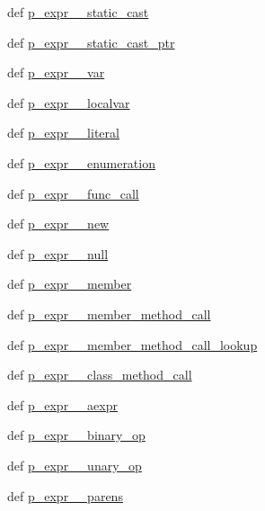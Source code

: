 \begin{DoxyCompactItemize}
\item 
def \hyperlink{classslicc_1_1parser_1_1SLICC_ae253508b9c4220db9770ebb3e7b3067c}{p\_\-expr\_\-\_\-static\_\-cast}
\item 
def \hyperlink{classslicc_1_1parser_1_1SLICC_a82e8e91f1fd31d30fbf563ddd8bca5f9}{p\_\-expr\_\-\_\-static\_\-cast\_\-ptr}
\item 
def \hyperlink{classslicc_1_1parser_1_1SLICC_a9161ad18c5b00a1568d3434079fc118c}{p\_\-expr\_\-\_\-var}
\item 
def \hyperlink{classslicc_1_1parser_1_1SLICC_a62d10d37bd83d7333afb87c080046378}{p\_\-expr\_\-\_\-localvar}
\item 
def \hyperlink{classslicc_1_1parser_1_1SLICC_a60b6aef0cc6effa1fe92344871861c82}{p\_\-expr\_\-\_\-literal}
\item 
def \hyperlink{classslicc_1_1parser_1_1SLICC_ac69362630073a12df80172dbc69a3130}{p\_\-expr\_\-\_\-enumeration}
\item 
def \hyperlink{classslicc_1_1parser_1_1SLICC_acea928fb7b3faee78d787636d4acfadf}{p\_\-expr\_\-\_\-func\_\-call}
\item 
def \hyperlink{classslicc_1_1parser_1_1SLICC_a1b0308a72b6175e110a9ab3211b3f5f7}{p\_\-expr\_\-\_\-new}
\item 
def \hyperlink{classslicc_1_1parser_1_1SLICC_a530b5d501e3749694fc8ff43b0cccfe6}{p\_\-expr\_\-\_\-null}
\item 
def \hyperlink{classslicc_1_1parser_1_1SLICC_a368de9191588eda3ef23d5c70a925f2e}{p\_\-expr\_\-\_\-member}
\item 
def \hyperlink{classslicc_1_1parser_1_1SLICC_ab69f80240020a575538a4020423f6fb9}{p\_\-expr\_\-\_\-member\_\-method\_\-call}
\item 
def \hyperlink{classslicc_1_1parser_1_1SLICC_a9f4d3bdee654812bf1f5ad304c6770eb}{p\_\-expr\_\-\_\-member\_\-method\_\-call\_\-lookup}
\item 
def \hyperlink{classslicc_1_1parser_1_1SLICC_ae00e73eee817bee36138e741067e1f02}{p\_\-expr\_\-\_\-class\_\-method\_\-call}
\item 
def \hyperlink{classslicc_1_1parser_1_1SLICC_a19c8ee869a956f0f8ff0cc76c60bea40}{p\_\-expr\_\-\_\-aexpr}
\item 
def \hyperlink{classslicc_1_1parser_1_1SLICC_ad3ab7bf47fe2daa12fb9103972144b2b}{p\_\-expr\_\-\_\-binary\_\-op}
\item 
def \hyperlink{classslicc_1_1parser_1_1SLICC_af3393422d64f7af992b9301c8428c90c}{p\_\-expr\_\-\_\-unary\_\-op}
\item 
def \hyperlink{classslicc_1_1parser_1_1SLICC_a7d93fa884e4ca511dd54f7b402ffaf6f}{p\_\-expr\_\-\_\-parens}

\end{DoxyCompactItemize}
